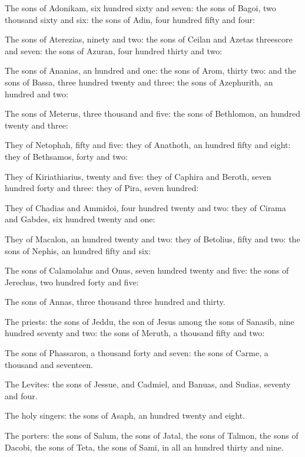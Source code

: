 {\par }{\PP {}The sons of Adonikam, six hundred sixty and seven: the sons of Bagoi, two thousand sixty and six: the sons of Adin, four hundred fifty and four:
\par }{\PP {}The sons of Aterezias, ninety and two: the sons of Ceilan and Azetas threescore and seven: the sons of Azuran, four hundred thirty and two:
\par }{\PP {}The sons of Ananias, an hundred and one: the sons of Arom, thirty two: and the sons of Bassa, three hundred twenty and three: the sons of Azephurith, an hundred and two:
\par }{\PP {}The sons of Meterus, three thousand and five: the sons of Bethlomon, an hundred twenty and three:
\par }{\PP {}They of Netophah, fifty and five: they of Anathoth, an hundred fifty and eight: they of Bethsamos, forty and two:
\par }{\PP {}They of Kiriathiarius, twenty and five: they of Caphira and Beroth, seven hundred forty and three: they of Pira, seven hundred:
\par }{\PP {}They of Chadias and Ammidoi, four hundred twenty and two: they of Cirama and Gabdes, six hundred twenty and one:
\par }{\PP {}They of Macalon, an hundred twenty and two: they of Betolius, fifty and two: the sons of Nephis, an hundred fifty and six:
\par }{\PP {}The sons of Calamolalus and Onus, seven hundred twenty and five: the sons of Jerechus, two hundred forty and five:
\par }{\PP {}The sons of Annas, three thousand three hundred and thirty.
\par }{\PP {}The priests: the sons of Jeddu, the son of Jesus among the sons of Sanasib, nine hundred seventy and two: the sons of Meruth, a thousand fifty and two:
\par }{\PP {}The sons of Phassaron, a thousand forty and seven: the sons of Carme, a thousand and seventeen.
\par }{\PP {}The Levites: the sons of Jessue, and Cadmiel, and Banuas, and Sudias, seventy and four.
\par }{\PP {}The holy singers: the sons of Asaph, an hundred twenty and eight.
\par }{\PP {}The porters: the sons of Salum, the sons of Jatal, the sons of Talmon, the sons of Dacobi, the sons of Teta, the sons of Sami, in all an hundred thirty and nine.
}

